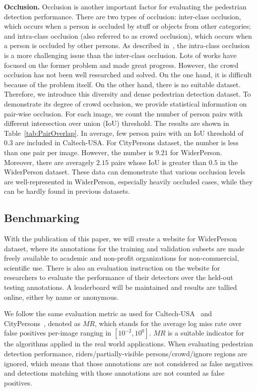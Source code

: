 \documentclass[journal]{IEEEtran}
\begin{document}
{\flushleft \textbf{Occlusion. }}
Occlusion is another important factor for evaluating the pedestrian detection performance. There are two types of occlusion: inter-class occlusion, which occurs when a person is occluded by stuff or objects from other categories; and intra-class occlusion (also referred to as crowd occlusion), which occurs when a person is occluded by other persons. As described in~\cite{DBLP:journals/corr/abs-1711-07752}, the intra-class occlusion is a more challenging issue than the inter-class occlusion. Lots of works have focused on the former problem and made great progress. However, the crowd occlusion has not been well researched and solved. On the one hand, it is difficult because of the problem itself. On the other hand, there is no suitable dataset. Therefore, we introduce this diversity and dense pedestrian detection dataset. To demonstrate its degree of crowd occlusion, we provide statistical information on pair-wise occlusion. For each image, we count the number of person pairs with different intersection over union (IoU) threshold. The results are shown in Table~\ref{tab:PairOverlap}. In average, few person pairs with an IoU threshold of $0.3$ are included in Caltech-USA. For CityPersons dataset, the number is less than one pair per image. However, the number is $9.21$ for WiderPerson. Moreover, there are averagely $2.15$ pairs whose IoU is greater than $0.5$ in the WiderPerson dataset. These data can demonstrate that various occlusion levels are well-represented in WiderPerson, especially heavily occluded cases, while they can be hardly found in previous datasets.


\subsection{Benchmarking}\label{subsec:benchmarking}
With the publication of this paper, we will create a website for WiderPerson dataset, where its annotations for the training and validation subsets are made freely available to academic and non-profit organizations for non-commercial, scientific use. There is also an evaluation instruction on the website for researchers to evaluate the performance of their detectors over the held-out testing annotations. A leaderboard will be maintained and results are tallied online, either by name or anonymous.

We follow the same evaluation metric as used for Caltech-USA~\cite{DBLP:journals/pami/DollarWSP12} and CityPersons~\cite{DBLP:conf/cvpr/ZhangBS17}, denoted as $MR$, which stands for the average log miss rate over false positives per-image ranging in $\left[ 10^{-2}, 10^0\right]$. $MR$ is a suitable indicator for the algorithms applied in the real world applications. When evaluating pedestrian detection performance, riders/partially-visible persons/crowd/ignore regions are ignored, which means that those annotations are not considered as false negatives and detections matching with those annotations are not counted as false positives.
\end{document}

